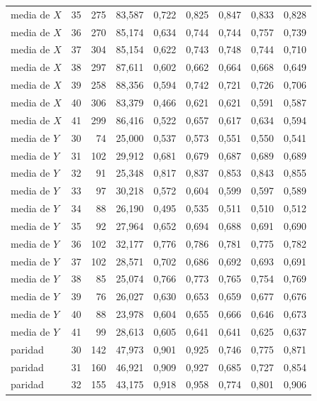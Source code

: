 \begin{table}[htbp]
{\begin{tabular}{@{}lrrrrrrrr@{}}
        media de $X$ & 35 & 275 & 83,587 & 0,722 & 0,825 & 0,847 & 0,833 & 0,828 \\
        media de $X$ & 36 & 270 & 85,174 & 0,634 & 0,744 & 0,744 & 0,757 & 0,739 \\
        media de $X$ & 37 & 304 & 85,154 & 0,622 & 0,743 & 0,748 & 0,744 & 0,710 \\
        media de $X$ & 38 & 297 & 87,611 & 0,602 & 0,662 & 0,664 & 0,668 & 0,649 \\
        media de $X$ & 39 & 258 & 88,356 & 0,594 & 0,742 & 0,721 & 0,726 & 0,706 \\
        media de $X$ & 40 & 306 & 83,379 & 0,466 & 0,621 & 0,621 & 0,591 & 0,587 \\
        media de $X$ & 41 & 299 & 86,416 & 0,522 & 0,657 & 0,617 & 0,634 & 0,594 \\
        media de $Y$ & 30 & 74 & 25,000 & 0,537 & 0,573 & 0,551 & 0,550 & 0,541 \\
        media de $Y$ & 31 & 102 & 29,912 & 0,681 & 0,679 & 0,687 & 0,689 & 0,689 \\
        media de $Y$ & 32 & 91 & 25,348 & 0,817 & 0,837 & 0,853 & 0,843 & 0,855 \\
        media de $Y$ & 33 & 97 & 30,218 & 0,572 & 0,604 & 0,599 & 0,597 & 0,589 \\
        media de $Y$ & 34 & 88 & 26,190 & 0,495 & 0,535 & 0,511 & 0,510 & 0,512 \\
        media de $Y$ & 35 & 92 & 27,964 & 0,652 & 0,694 & 0,688 & 0,691 & 0,690 \\
        media de $Y$ & 36 & 102 & 32,177 & 0,776 & 0,786 & 0,781 & 0,775 & 0,782 \\
        media de $Y$ & 37 & 102 & 28,571 & 0,702 & 0,686 & 0,692 & 0,693 & 0,691 \\
        media de $Y$ & 38 & 85 & 25,074 & 0,766 & 0,773 & 0,765 & 0,754 & 0,769 \\
        media de $Y$ & 39 & 76 & 26,027 & 0,630 & 0,653 & 0,659 & 0,677 & 0,676 \\
        media de $Y$ & 40 & 88 & 23,978 & 0,604 & 0,655 & 0,666 & 0,646 & 0,673 \\
        media de $Y$ & 41 & 99 & 28,613 & 0,605 & 0,641 & 0,641 & 0,625 & 0,637 \\
        paridad & 30 & 142 & 47,973 & 0,901 & 0,925 & 0,746 & 0,775 & 0,871 \\
        paridad & 31 & 160 & 46,921 & 0,909 & 0,927 & 0,685 & 0,727 & 0,854 \\
        paridad & 32 & 155 & 43,175 & 0,918 & 0,958 & 0,774 & 0,801 & 0,906 \\

\end{tabular}}
\end{table}
